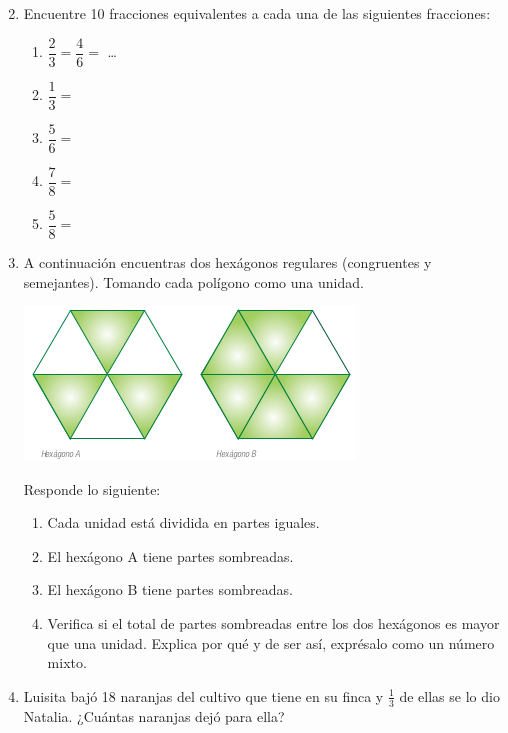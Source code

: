 \documentclass[fleqn]{article}
\begin{document}
\begin{enumerate}
\begin{enumerate}
\begin{multicols}{2}
  \end{multicols}
 \end{enumerate}
 \item Encuentre 10 fracciones equivalentes a cada una de las siguientes fracciones:
 \begin{enumerate}
 \item $\dfrac{2}{3}=\dfrac{4}{6}=$ \dots
 \item $\dfrac{1}{3}=$
 \item $\dfrac{5}{6}=$
 \item $\dfrac{7}{8}=$
  \item $\dfrac{5}{8}=$
 \end{enumerate}
  \item A continuación encuentras dos hexágonos regulares (congruentes y semejantes). Tomando cada polígono como una unidad.
\begin{center}
 \includegraphics[scale=.5]{Images/hexagonos.png} 
 \end{center} 
 Responde lo siguiente:
 \begin{enumerate}
 \item Cada unidad está dividida en \underline{\hspace*{20pt}} partes
iguales.
 \item El hexágono A tiene \underline{\hspace*{20pt}} partes sombreadas.
 \item El hexágono B tiene \underline{\hspace*{20pt}} partes sombreadas.
 \item Verifica si el total de partes sombreadas entre los dos hexágonos es mayor que una unidad. Explica por qué y de ser así, exprésalo como un
número mixto.\noanswer[1in]
 \end{enumerate}
 \item Luisita bajó 18 naranjas del cultivo que tiene en su finca y $\frac{1}{3}$ de ellas se lo dio Natalia. ¿Cuántas naranjas dejó para ella?\noanswer

 \end{enumerate}
\end{document}
